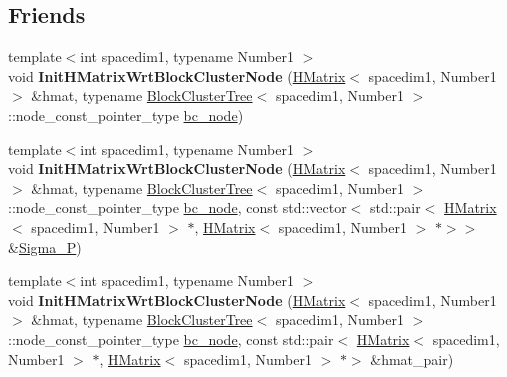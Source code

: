 \subsection*{Friends}
\begin{DoxyCompactItemize}
\item 
\mbox{\label{classHMatrix_aa949159fde08b9c728ce2cd4c6b99de6}} 
{\footnotesize template$<$int spacedim1, typename Number1 $>$ }\\void {\bfseries Init\+H\+Matrix\+Wrt\+Block\+Cluster\+Node} (\hyperlink{classHMatrix}{H\+Matrix}$<$ spacedim1, Number1 $>$ \&hmat, typename \hyperlink{classBlockClusterTree}{Block\+Cluster\+Tree}$<$ spacedim1, Number1 $>$\+::node\+\_\+const\+\_\+pointer\+\_\+type \hyperlink{classHMatrix_a4a304494c970b5b267be1d8459d51586}{bc\+\_\+node})
\item 
\mbox{\label{classHMatrix_ab5b4274a06c4ec21a0c1ee4ed870d3a3}} 
{\footnotesize template$<$int spacedim1, typename Number1 $>$ }\\void {\bfseries Init\+H\+Matrix\+Wrt\+Block\+Cluster\+Node} (\hyperlink{classHMatrix}{H\+Matrix}$<$ spacedim1, Number1 $>$ \&hmat, typename \hyperlink{classBlockClusterTree}{Block\+Cluster\+Tree}$<$ spacedim1, Number1 $>$\+::node\+\_\+const\+\_\+pointer\+\_\+type \hyperlink{classHMatrix_a4a304494c970b5b267be1d8459d51586}{bc\+\_\+node}, const std\+::vector$<$ std\+::pair$<$ \hyperlink{classHMatrix}{H\+Matrix}$<$ spacedim1, Number1 $>$ $\ast$, \hyperlink{classHMatrix}{H\+Matrix}$<$ spacedim1, Number1 $>$ $\ast$$>$$>$ \&\hyperlink{classHMatrix_a3d96d0252ef8c873ae06cf87874acaf3}{Sigma\+\_\+P})
\item 
\mbox{\label{classHMatrix_abe123e0f8daa856e4b85e00829398b79}} 
{\footnotesize template$<$int spacedim1, typename Number1 $>$ }\\void {\bfseries Init\+H\+Matrix\+Wrt\+Block\+Cluster\+Node} (\hyperlink{classHMatrix}{H\+Matrix}$<$ spacedim1, Number1 $>$ \&hmat, typename \hyperlink{classBlockClusterTree}{Block\+Cluster\+Tree}$<$ spacedim1, Number1 $>$\+::node\+\_\+const\+\_\+pointer\+\_\+type \hyperlink{classHMatrix_a4a304494c970b5b267be1d8459d51586}{bc\+\_\+node}, const std\+::pair$<$ \hyperlink{classHMatrix}{H\+Matrix}$<$ spacedim1, Number1 $>$ $\ast$, \hyperlink{classHMatrix}{H\+Matrix}$<$ spacedim1, Number1 $>$ $\ast$$>$ \&hmat\+\_\+pair)
\item 
\mbox{\label{classHMatrix_ac9dff162efb21e08ab5d6fc3bc2219fa}} 
$$
\end{DoxyCompactItemize}
